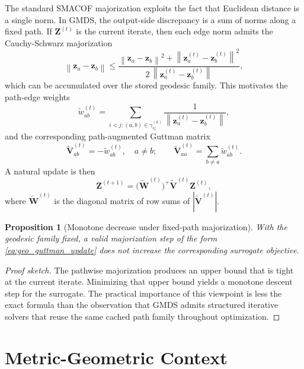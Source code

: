 \documentclass[11pt]{article}
\newcommand{\bz}{\mathbf{z}}
\newcommand{\bZ}{\mathbf{Z}}
\newcommand{\bV}{\mathbf{V}}
\newcommand{\bW}{\mathbf{W}}
\newcommand{\norm}[1]{\left\|#1\right\|}
\theoremstyle{definition}
\theoremstyle{plain}
\newtheorem{proposition}{Proposition}[section]
\theoremstyle{remark}
\begin{document}
The standard SMACOF majorization exploits the fact that Euclidean distance is a
single norm.  In GMDS, the output-side discrepancy is a sum of norms along a
fixed path.  If $\bZ^{(t)}$ is the current iterate, then each edge norm admits
the Cauchy-Schwarz majorization
\begin{equation}
  \norm{\bz_a - \bz_b}
  \leq
  \frac{\norm{\bz_a - \bz_b}^2 + \norm{\bz^{(t)}_a - \bz^{(t)}_b}^2}
       {2\,\norm{\bz^{(t)}_a - \bz^{(t)}_b}},
  \label{eq:cs_majorization}
\end{equation}
which can be accumulated over the stored geodesic family.  This motivates the
path-edge weights
\begin{equation}
  \tilde{w}_{ab}^{(t)}
  = \sum_{i < j : (a,b) \in \gamma_{ij}^{(k)}}
    \frac{1}{\norm{\bz^{(t)}_a - \bz^{(t)}_b}},
  \label{eq:path_edge_weight}
\end{equation}
and the corresponding path-augmented Guttman matrix
\begin{equation}
  \tilde{\bV}^{(t)}_{ab}
  = -\tilde{w}^{(t)}_{ab}, \quad a \neq b; \qquad
  \tilde{\bV}^{(t)}_{aa}
  = \sum_{b \neq a} \tilde{w}^{(t)}_{ab}.
  \label{eq:augmented_guttman}
\end{equation}
A natural update is then
\begin{equation}
  \bZ^{(t+1)} = \bigl(\tilde{\bW}^{(t)}\bigr)^+ \tilde{\bV}^{(t)} \bZ^{(t)},
  \label{eq:geo_guttman_update}
\end{equation}
where $\tilde{\bW}^{(t)}$ is the diagonal matrix of row sums of
$|\tilde{\bV}^{(t)}|$.

\begin{proposition}[Monotone decrease under fixed-path majorization]
  \label{prop:monotone}
  With the geodesic family fixed, a valid majorization step of the form
  \eqref{eq:geo_guttman_update} does not increase the corresponding surrogate
  objective.
\end{proposition}

\begin{proof}[Proof sketch]
  The pathwise majorization produces an upper bound that is tight at the current
  iterate.  Minimizing that upper bound yields a monotone descent step for the
  surrogate.  The practical importance of this viewpoint is less the exact
  formula than the observation that GMDS admits structured iterative solvers
  that reuse the same cached path family throughout optimization.
\end{proof}

\section{Metric-Geometric Context}
\label{sec:metric_geometry_v4}
\label{sec:metric_geometry}
\end{document}
